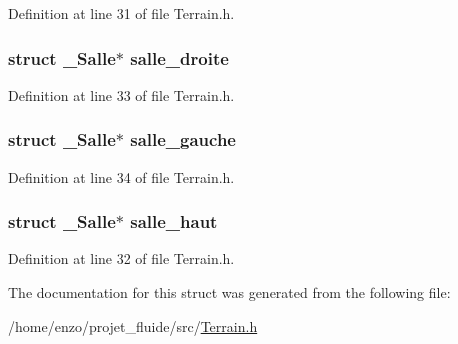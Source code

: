 Definition at line 31 of file Terrain.\-h.

\hypertarget{struct___salle_abfc5cf6453be9701bad25e9b464e6a63}{
\subsubsection[{salle\-\_\-droite}]{\setlength{\rightskip}{0pt plus 5cm}struct {\bf \-\_\-\-Salle}$\ast$ salle\-\_\-droite}}\label{struct___salle_abfc5cf6453be9701bad25e9b464e6a63}


Definition at line 33 of file Terrain.\-h.

\hypertarget{struct___salle_af01484c040a5ff15b3f5487acefa31f9}{
\subsubsection[{salle\-\_\-gauche}]{\setlength{\rightskip}{0pt plus 5cm}struct {\bf \-\_\-\-Salle}$\ast$ salle\-\_\-gauche}}\label{struct___salle_af01484c040a5ff15b3f5487acefa31f9}


Definition at line 34 of file Terrain.\-h.

\hypertarget{struct___salle_af393d5336c949f3725154408969f9d32}{
\subsubsection[{salle\-\_\-haut}]{\setlength{\rightskip}{0pt plus 5cm}struct {\bf \-\_\-\-Salle}$\ast$ salle\-\_\-haut}}\label{struct___salle_af393d5336c949f3725154408969f9d32}


Definition at line 32 of file Terrain.\-h.



The documentation for this struct was generated from the following file\-:\begin{DoxyCompactItemize}
\item 
/home/enzo/projet\-\_\-fluide/src/\hyperlink{_terrain_8h}{Terrain.\-h}\end{DoxyCompactItemize}
